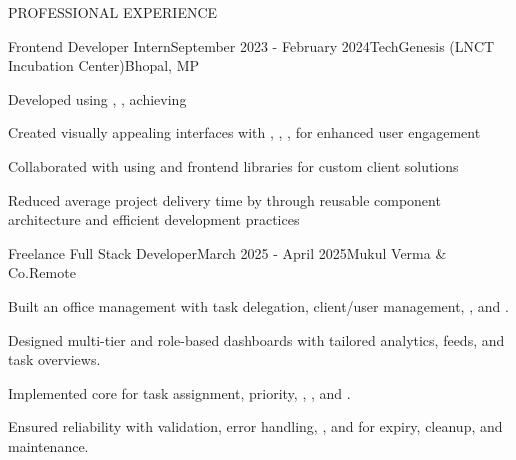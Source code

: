 \documentclass{resume}
\begin{document}
\begin{rSection}{PROFESSIONAL EXPERIENCE}

\begin{rExperience}{Frontend Developer Intern}{September 2023 - February 2024}{TechGenesis (LNCT Incubation Center)}{Bhopal, MP}
\item Developed  using , ,  achieving 
\item Created visually appealing interfaces with , , ,  for enhanced user engagement
\item Collaborated with  using  and frontend libraries for custom client solutions
\item Reduced average project delivery time by  through reusable component architecture and efficient development practices
\end{rExperience}

\begin{rExperience}{Freelance Full Stack Developer}{March 2025 - April 2025}{Mukul Verma \& Co.}{Remote}
\item Built an office management  with task delegation, client/user management, , and .
\item Designed multi-tier  and role-based dashboards with tailored analytics, feeds, and task overviews.
\item Implemented core  for task assignment, priority, , , and .
\item Ensured reliability with validation, error handling, , and  for expiry, cleanup, and maintenance.
\end{rExperience}

\end{rSection}
\end{document}
